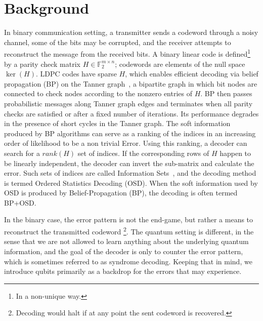 \section{Background\label{sec:background}}
In binary communication setting, a transmitter sends a codeword through a noisy channel, some of the bits may be corrupted, and the receiver attempts to reconstruct the message from the received bits. 
A binary linear code is defined\footnote{In a non-unique way.} by a parity check matrix \(H \in \mathbb{F}_2^{m \times n}\); codewords are elements of the null space \(\ker(H)\). LDPC codes have sparse \(H\), which enables efficient decoding via belief propagation (BP) on the Tanner graph~\cite{tanner1981recursive}, a bipartite graph in which bit nodes are connected to check nodes according to the nonzero entries of \(H\). BP then passes probabilistic messages along Tanner graph edges and terminates when all parity checks are satisfied or after a fixed number of iterations. 
Its performance degrades in the presence of short cycles in the Tanner graph. 
The soft information produced by BP algorithms can serve as a ranking of the indices in an increasing order of likelihood to be a non trivial Error. 
Using this ranking, a decoder can search for a \(rank(H)\) set of indices. If the corresponding rows of \(H\) happen to be linearly independent, the decoder can invert the sub-matrix and calculate the error.
Such sets of indices are called Information Sets~\cite{fossorier1995soft}, and the decoding method is termed Ordered Statistics Decoding (OSD). When the soft information used by OSD is produced by Belief-Propagation (BP), the decoding is often termed BP+OSD.

\noindent In the binary case, 
the error pattern is not the end-game, but rather a means to reconstruct the transmitted codeword
\footnote{Decoding would halt if at any point the sent codeword is recovered.}. 
The quantum setting is different, in the sense that we are not allowed to learn anything about the underlying quantum information, and the goal of the decoder is only to counter the error pattern, which is sometimes referred to as syndrome decoding. Keeping that in mind, we introduce qubits primarily as a backdrop for the errors that may experience.
